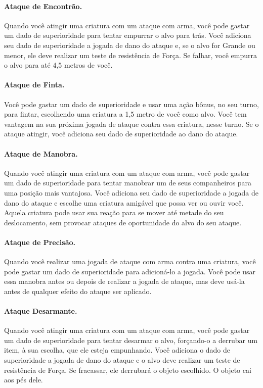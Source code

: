 \documentclass{RPG_Adventure}[2021/10/20]
\begin{document}
\paragraph{Ataque de Encontrão.} Quando você atingir uma criatura com um ataque
com arma, você pode gastar um dado de superioridade para tentar empurrar o alvo
para trás. Você adiciona seu dado de superioridade a jogada de dano do ataque e,
se o alvo for Grande ou menor, ele deve realizar um teste de resistência de
Força. Se falhar, você empurra o alvo para até 4,5 metros de você.

\paragraph{Ataque de Finta.} Você pode gastar um dado de superioridade e usar
uma ação bônus, no seu turno, para fintar, escolhendo uma criatura a 1,5 metro
de você como alvo. Você tem vantagem na sua próxima jogada de ataque contra essa
criatura, nesse turno. Se o ataque atingir, você adiciona seu dado de
superioridade ao dano do ataque.

\paragraph{Ataque de Manobra.} Quando você atingir uma criatura com um ataque
com arma, você pode gastar um dado de superioridade para tentar manobrar um de
seus companheiros para uma posição mais vantajosa. Você adiciona seu dado de
superioridade a jogada de dano do ataque e escolhe uma criatura amigável que
possa ver ou ouvir você. Aquela criatura pode usar sua reação para se mover até
metade do seu deslocamento, sem provocar ataques de oportunidade do alvo do seu
ataque.

\paragraph{Ataque de Precisão.} Quando você realizar uma jogada de ataque com
arma contra uma criatura, você pode gastar um dado de superioridade para
adicioná-lo a jogada. Você pode usar essa manobra antes ou depois de realizar a
jogada de ataque, mas deve usá-la antes de qualquer efeito do ataque ser
aplicado.

\paragraph{Ataque Desarmante.} Quando você atingir uma criatura com um ataque
com arma, você pode gastar um dado de superioridade para tentar desarmar o alvo,
forçando-o a derrubar um item, à sua escolha, que ele esteja empunhando. Você
adiciona o dado de superioridade a jogada de dano do ataque e o alvo deve
realizar um teste de resistência de Força. Se fracassar, ele derrubará o objeto
escolhido. O objeto cai aos pés dele.
\end{document}
